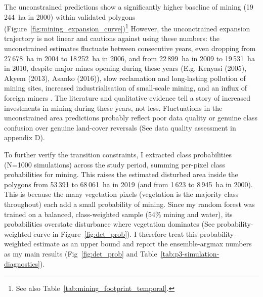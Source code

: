 \documentclass[]{interact}
\begin{document}
The unconstrained predictions show a significantly higher baseline of mining (19\,244~ha in 2000) within validated polygons (Figure~\ref{fig:mining_expansion_curve})\footnote{See also Table~\ref{tab:mining_footprint_temporal}.} However, the unconctrained expansion trajectory is not linear and cautions against using these numbers: the unconstrained estimates fluctuate between consecutive years, even dropping from 27\,678~ha in 2004 to 18\,252~ha in 2006, and from 22\,899~ha in 2009 to 19\,531~ha in 2010, despite major mines opening during these years (E.g. Kenyasi (2005), Akyem (2013), Asanko (2016)), slow reclamation and long-lasting pollution of mining sites, increased industrialisation of small-scale mining, and an influx of foreign miners \citep{kumah2023Chinese,mensah2025Health}. The literature and qualitative evidence tell a story of increased investments in mining during these years, not less. Fluctuations in the unconstrained area predictions probably reflect poor data quality or genuine class confusion over genuine land-cover reversals (See data quality assessment in appendix D).

To further verify the transition constraints, I extracted class probabilities (N=1000 simulations) across the study period, summing per-pixel class probabilities for mining. This raises the estimated disturbed area inside the polygons from 53\,391 to 68\,061~ha in 2019 (and from 1\,623 to 8\,945~ha in 2000). This is because the many vegetation pixels (vegetation is the majority class throughout) each add a small probability of mining. Since my random forest was trained on a balanced, class-weighted sample (54\% mining and water), its probabilities overstate disturbance where vegetation dominates (See probability-weighted curve in Figure~\ref{fig:det_prob}). I therefore treat this probability-weighted estimate as an upper bound and report the ensemble-argmax numbers as my main results (Fig~\ref{fig:det_prob} and Table~\ref{tab:p3-simulation-diagnostics}).
\end{document}

